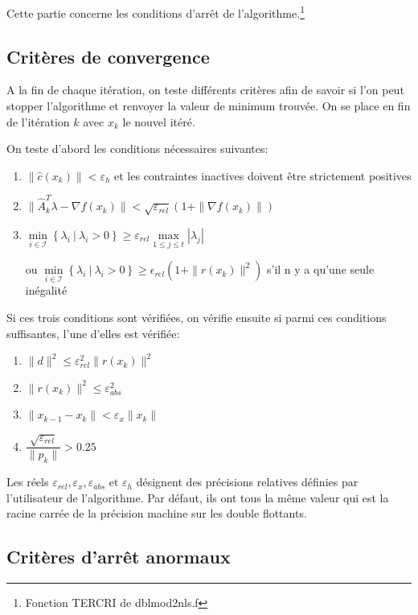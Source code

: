 \documentclass[a4paper,11pt]{article}
\numberwithin{equation}{section}
\begin{document}
Cette partie concerne les conditions d'arrêt de l'algorithme.\footnote{Fonction TERCRI de dblmod2nls.f} 
\subsection{Critères de convergence}

A la fin de chaque itération, on teste différents critères afin de savoir si l'on peut stopper l'algorithme et renvoyer la valeur de minimum trouvée. On se place en fin de l'itération $k$ avec $x_{k}$ le nouvel itéré.

On teste d'abord les conditions nécessaires suivantes:
\begin{enumerate}
\item
$\|\hat{c}(x_{k})\| < \varepsilon_{h}$  et les contraintes inactives doivent être strictement positives
\item
$\|\hat{A}_{k}^T\lambda - \nabla f(x_{k})\| < \sqrt{\varepsilon_{rel}}\left(1+\|\nabla f(x_{k})\|\right)$
\item
$\underset{i \in \mathcal{I}}{\min}\left\{ \lambda_i\ |\ \lambda_i > 0 \right\} \geq \varepsilon_{rel} \underset{1\leq j\leq t}{\max} |\lambda_j|$ 

$\text{ou } \underset{i \in \mathcal{I}}{\min}\left\{ \lambda_i\ |\ \lambda_i > 0 \right\} \geq \epsilon_{rel} \left(1+\|r(x_{k})\|^2\right) $ s'il n y a qu'une seule inégalité
\end{enumerate}

Si ces trois conditions sont vérifiées, on vérifie ensuite si parmi ces conditions suffisantes, l'une d'elles est vérifiée: 

\begin{enumerate}
\item
$\|d\|^2 \leq \varepsilon_{rel}^2 \|r(x_{k})\|^2$
\item
$\|r(x_{k})\|^2 \leq \varepsilon_{abs}^2$
\item
$\|x_{k-1} - x_k\| < \varepsilon_{x}\|x_k\|$
\item
$\dfrac{\sqrt{\varepsilon_{rel}}}{\|p_k\|} > 0.25$
\end{enumerate}

Les réels $\varepsilon_{rel},\varepsilon_{x}, \varepsilon_{abs} \text{ et } \varepsilon_{h}$ désignent des précisions relatives définies par l'utilisateur de l'algorithme. Par défaut, ils ont tous la même valeur qui est la racine carrée de la précision machine sur les double flottants.

\subsection{Critères d'arrêt anormaux}
\end{document}
